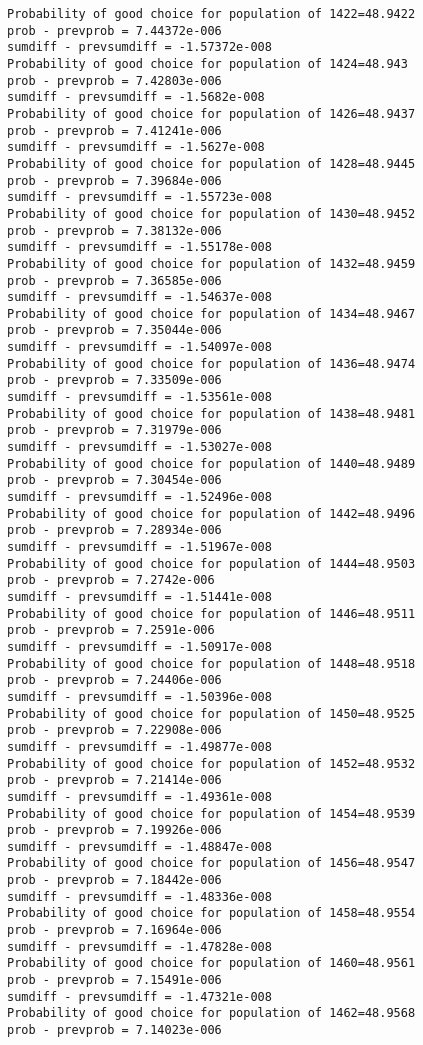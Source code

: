 \documentclass[11pt,onecolumn]{article}
\begin{document}
\begin{verbatim}
Probability of good choice for population of 1422=48.9422
prob - prevprob = 7.44372e-006
sumdiff - prevsumdiff = -1.57372e-008
Probability of good choice for population of 1424=48.943
prob - prevprob = 7.42803e-006
sumdiff - prevsumdiff = -1.5682e-008
Probability of good choice for population of 1426=48.9437
prob - prevprob = 7.41241e-006
sumdiff - prevsumdiff = -1.5627e-008
Probability of good choice for population of 1428=48.9445
prob - prevprob = 7.39684e-006
sumdiff - prevsumdiff = -1.55723e-008
Probability of good choice for population of 1430=48.9452
prob - prevprob = 7.38132e-006
sumdiff - prevsumdiff = -1.55178e-008
Probability of good choice for population of 1432=48.9459
prob - prevprob = 7.36585e-006
sumdiff - prevsumdiff = -1.54637e-008
Probability of good choice for population of 1434=48.9467
prob - prevprob = 7.35044e-006
sumdiff - prevsumdiff = -1.54097e-008
Probability of good choice for population of 1436=48.9474
prob - prevprob = 7.33509e-006
sumdiff - prevsumdiff = -1.53561e-008
Probability of good choice for population of 1438=48.9481
prob - prevprob = 7.31979e-006
sumdiff - prevsumdiff = -1.53027e-008
Probability of good choice for population of 1440=48.9489
prob - prevprob = 7.30454e-006
sumdiff - prevsumdiff = -1.52496e-008
Probability of good choice for population of 1442=48.9496
prob - prevprob = 7.28934e-006
sumdiff - prevsumdiff = -1.51967e-008
Probability of good choice for population of 1444=48.9503
prob - prevprob = 7.2742e-006
sumdiff - prevsumdiff = -1.51441e-008
Probability of good choice for population of 1446=48.9511
prob - prevprob = 7.2591e-006
sumdiff - prevsumdiff = -1.50917e-008
Probability of good choice for population of 1448=48.9518
prob - prevprob = 7.24406e-006
sumdiff - prevsumdiff = -1.50396e-008
Probability of good choice for population of 1450=48.9525
prob - prevprob = 7.22908e-006
sumdiff - prevsumdiff = -1.49877e-008
Probability of good choice for population of 1452=48.9532
prob - prevprob = 7.21414e-006
sumdiff - prevsumdiff = -1.49361e-008
Probability of good choice for population of 1454=48.9539
prob - prevprob = 7.19926e-006
sumdiff - prevsumdiff = -1.48847e-008
Probability of good choice for population of 1456=48.9547
prob - prevprob = 7.18442e-006
sumdiff - prevsumdiff = -1.48336e-008
Probability of good choice for population of 1458=48.9554
prob - prevprob = 7.16964e-006
sumdiff - prevsumdiff = -1.47828e-008
Probability of good choice for population of 1460=48.9561
prob - prevprob = 7.15491e-006
sumdiff - prevsumdiff = -1.47321e-008
Probability of good choice for population of 1462=48.9568
prob - prevprob = 7.14023e-006

\end{verbatim}
\end{document}
